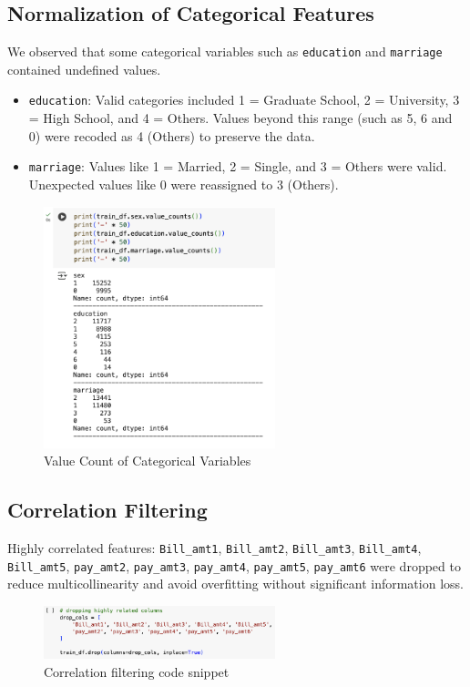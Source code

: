 \documentclass[12pt,a4paper]{article}
\begin{document}
\subsection{Normalization of Categorical Features}
We observed that some categorical variables such as \texttt{education} and \texttt{marriage} contained undefined values.
\begin{itemize}
    \item \texttt{education}: Valid categories included 1 = Graduate School, 2 = University, 3 = High School, and 4 = Others. Values beyond this range (such as 5, 6 and 0) were recoded as 4 (Others) to preserve the data.
    \item \texttt{marriage}: Values like 1 = Married, 2 = Single, and 3 = Others were valid. Unexpected values like 0 were reassigned to 3 (Others).
\end{itemize}
\begin{figure}[H]
    \centering
    \includegraphics[width=0.6\textwidth]{figures/8.png}
    \caption{Value Count of Categorical Variables}
\end{figure}

\subsection{Correlation Filtering}
Highly correlated features: \texttt{Bill\_amt1}, \texttt{Bill\_amt2}, \texttt{Bill\_amt3}, \texttt{Bill\_amt4}, \texttt{Bill\_amt5}, \texttt{pay\_amt2}, \texttt{pay\_amt3}, \texttt{pay\_amt4}, \texttt{pay\_amt5}, \texttt{pay\_amt6} were dropped to reduce multicollinearity and avoid overfitting without significant information loss.
\begin{figure}[H]
    \centering
    \includegraphics[width=0.6\textwidth]{figures/9.png}
    \caption{Correlation filtering code snippet}
\end{figure}
\end{document}
